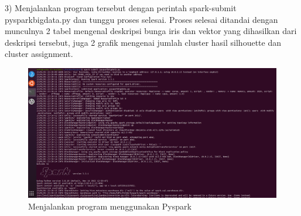 \begin{enumerate}
3) Menjalankan program tersebut dengan perintah spark-submit pysparkbigdata.py dan tunggu proses selesai. Proses selesai ditandai dengan munculnya 2 tabel mengenal deskripsi bunga iris dan vektor yang dihasilkan dari deskripsi tersebut, juga 2 grafik mengenai jumlah cluster hasil silhouette dan cluster assignment.
\begin{figure}[!ht]
\includegraphics[width=.8\textwidth]{TugasKelompok/Kelompok4/runningdenganpyspark}
\caption{Menjalankan program menggunakan Pyspark}
\label{gam:perkuliahan-23-09}
\end{figure}


\end{enumerate}
